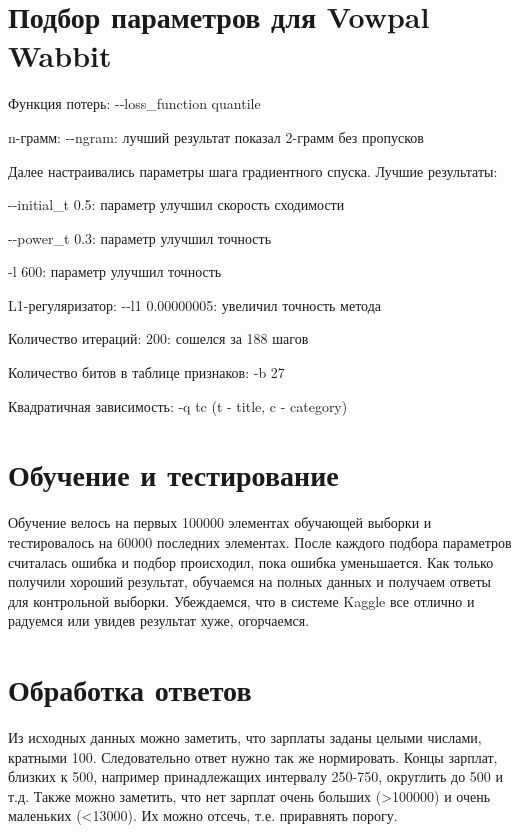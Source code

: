 \documentclass[12pt, a4paper]{article}
\begin{document}
    \newpage
    \section{Подбор параметров для Vowpal Wabbit}
        Функция потерь: -{}-loss\_function quantile
        
        n-грамм: -{}-ngram: лучший результат показал 2-грамм без пропусков
        
        Далее настраивались параметры шага градиентного спуска. Лучшие результаты:
        
            \indent\indent -{}-initial\_t 0.5: параметр улучшил скорость сходимости
        
            \indent\indent -{}-power\_t 0.3: параметр улучшил точность
        
            \indent\indent -l 600: параметр улучшил точность

        L1-регуляризатор: -{}-l1 0.00000005: увеличил точность метода

        Количество итераций: 200: сошелся за 188 шагов
        
        Количество битов в таблице признаков: -b 27
        
        Квадратичная зависимость: -q tc (t - title, c - category)

    \section{Обучение и тестирование}

        Обучение велось на первых 100000 элементах обучающей выборки и тестировалось на 60000 последних элементах. После каждого подбора параметров считалась ошибка и подбор происходил, пока ошибка уменьшается. Как только получили хороший результат, обучаемся на полных данных и получаем ответы для контрольной выборки. Убеждаемся, что в системе Kaggle все отлично и радуемся или увидев результат хуже, огорчаемся.

    \section{Обработка ответов}

        Из исходных данных можно заметить, что зарплаты заданы целыми числами, кратными 100. Следовательно ответ нужно так же нормировать. Концы зарплат, близких к 500, например принадлежащих интервалу 250-750, округлить до 500 и т.д. Также можно заметить, что нет зарплат очень больших (>100000) и очень маленьких (<13000). Их можно отсечь, т.е. приравнять порогу.
\end{document}
